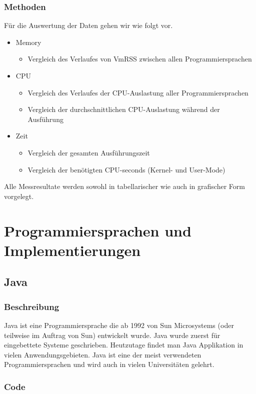 \documentclass{fancydocument}
\begin{document}
\subsubsection{Methoden}
Für die Auswertung der Daten gehen wir wie folgt vor.
\begin{itemize}
\item Memory
\begin{itemize}
\item Vergleich des Verlaufes von VmRSS zwischen allen Programmiersprachen
\end{itemize}
\item CPU
\begin{itemize}
\item Vergleich des Verlaufes der CPU-Auslastung aller Programmiersprachen
\item Vergleich der durchschnittlichen CPU-Auslastung während der Ausführung
\end{itemize}
\item Zeit
\begin{itemize}
\item Vergleich der gesamten Ausführungszeit
\item Vergleich der benötigten CPU-seconds (Kernel- und User-Mode)
\end{itemize}
\end{itemize}
Alle Messresultate werden sowohl in tabellarischer wie auch in grafischer Form vorgelegt.
\section{Programmiersprachen und Implementierungen}

\subsection{Java}
\subsubsection{Beschreibung}

Java ist eine Programmiersprache die ab 1992 von Sun Microsystems (oder
teilweise im Auftrag von Sun) entwickelt wurde. Java wurde zuerst f\"ur
eingebettete Systeme geschrieben. Heutzutage findet man Java Applikation in
vielen Anwendungsgebieten.
Java ist eine der meist verwendeten Programmiersprachen und wird auch
in vielen Universitäten gelehrt. 

\subsubsection{Code}
\end{document}
